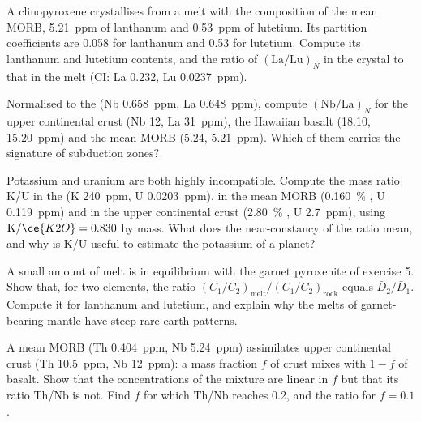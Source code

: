 \begin{exercise}[$\star\star$]\label{exo:b2:elements-in-the-earth:7}
A clinopyroxene crystallises from a melt with the composition of the mean MORB,
\qty{5.21}{ppm} of lanthanum and \qty{0.53}{ppm} of lutetium. Its partition
coefficients are 0.058 for lanthanum and 0.53 for lutetium. Compute its
lanthanum and lutetium contents, and the ratio of $(\mathrm{La}/\mathrm{Lu})_N$
in the crystal to that in the melt (CI: La 0.232, Lu \qty{0.0237}{ppm}).
\end{exercise}

\begin{exercise}[$\star\star$]\label{exo:b2:elements-in-the-earth:8}
Normalised to the  (Nb \qty{0.658}{ppm}, La \qty{0.648}{ppm}),
compute $(\mathrm{Nb}/\mathrm{La})_N$ for the upper continental crust (Nb 12,
La \qty{31}{ppm}), the Hawaiian basalt (18.10, \qty{15.20}{ppm}) and the mean MORB
(5.24, \qty{5.21}{ppm}). Which of them carries the signature of subduction zones?
\end{exercise}

\begin{exercise}[$\star\star$]\label{exo:b2:elements-in-the-earth:9}
Potassium and uranium are both highly incompatible. Compute the mass ratio K/U in
the  (K \qty{240}{ppm}, U \qty{0.0203}{ppm}), in the mean MORB
(\qty{0.160}{\percent} , U \qty{0.119}{ppm}) and in the upper continental
crust (\qty{2.80}{\percent} , U \qty{2.7}{ppm}), using
$\mathrm{K}/\ce{K2O} = 0.830$ by mass. What does the near-constancy of the ratio
mean, and why is K/U useful to estimate the potassium of a planet?
\end{exercise}

\begin{exercise}[$\star\star\star$]\label{exo:b2:elements-in-the-earth:10}
A small amount of melt is in equilibrium with the garnet pyroxenite of exercise
5. Show that, for two elements, the ratio
$(C_1/C_2)_{\mathrm{melt}}/(C_1/C_2)_{\mathrm{rock}}$ equals
$\bar D_2/\bar D_1$. Compute it for lanthanum and lutetium, and explain why the
melts of garnet-bearing mantle have steep rare earth patterns.
\end{exercise}

\begin{exercise}[$\star\star\star$]\label{exo:b2:elements-in-the-earth:11}
A mean MORB (Th \qty{0.404}{ppm}, Nb \qty{5.24}{ppm}) assimilates upper
continental crust (Th \qty{10.5}{ppm}, Nb \qty{12}{ppm}): a mass fraction $f$ of
crust mixes with $1-f$ of basalt. Show that the concentrations of the mixture are
linear in $f$ but that its ratio Th/Nb is not. Find $f$ for which Th/Nb reaches
0.2, and the ratio for $f = 0.1$.
\end{exercise}

